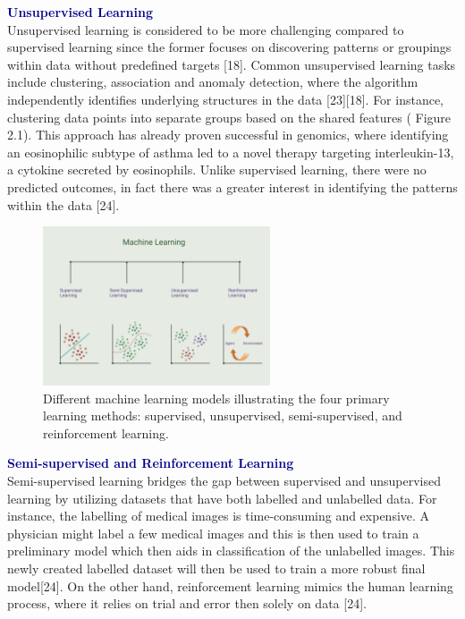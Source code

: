 \documentclass[12pt,a4paper]{report}
\begin{document}
\textbf{\textcolor{darkblue}{Unsupervised Learning}}\\
Unsupervised learning is considered to be more challenging compared to supervised learning since the former focuses on discovering patterns or groupings within data without predefined targets [18]. Common unsupervised learning tasks include clustering, association and anomaly detection, where the algorithm independently identifies underlying structures in the data [23][18].
For instance, clustering data points into separate groups based on the shared features ( Figure 2.1). This approach has already proven successful in genomics, where identifying an eosinophilic subtype of asthma led to a novel therapy targeting interleukin-13, a cytokine secreted by eosinophils. Unlike supervised learning, there were no predicted outcomes, in fact there was a greater interest in identifying the patterns within the data [24]. \\

\begin{figure}[h]
    \centering
    \includegraphics[width=0.6\textwidth]{images/ml.png} 
    \caption{Different machine learning models illustrating the four primary learning methods: supervised, unsupervised, semi-supervised, and reinforcement learning.}
    \label{Figure 1}
\end{figure}

\textbf{\textcolor{darkblue}{Semi-supervised and Reinforcement Learning}}\\
Semi-supervised learning bridges the gap between supervised and unsupervised learning by utilizing datasets that have both labelled and unlabelled data. For instance, 
the labelling of medical images is time-consuming and expensive. A physician might label a few medical images and this is then used to train a preliminary model which 
then aids in classification of the unlabelled images. This newly created labelled dataset will then be used to train a more robust final model[24]. On the other hand, reinforcement learning mimics the human learning process, where it relies on trial and error then solely on data [24]. \\
\end{document}
